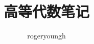 \documentclass{probook}
\title{高等代数笔记}
\author{rogeryoungh}
\begin{document}
\newcommand\mfrac[2]{\dfrac{#1\smash[b]{\strut}}{#2\smash[t]{\strut}}}
\newcommand\RR{\mathbb{R}}
\newcommand\NN{\mathbb{N}}
\newcommand\ZZ{\mathbb{Z}}
\newcommand\QQ{\mathbb{Q}}
\newcommand\CC{\mathbb{C}}
\newcommand\ee{\mathrm{e}}
\newcommand\dd{\mathrm{d}}
\newcommand\uppi{\mathrm{\pi}}
\newcommand\transpose[1]{{#1}^\mathsf{T}}

\newcommand\rank{\operatorname{rank}}
\newcommand\diag{\operatorname{diag}}
\renewcommand\Im{\operatorname{Im}}
\newcommand\tr{\operatorname{tr}}
\renewcommand\char{\operatorname{char}}
\newcommand\codim{\operatorname{codim}}

\newcommand\aaa{\alpha}
\newcommand\AAA{\boldsymbol{A}}
\newcommand\bbb{\beta}
\newcommand\eee{\eta}
\renewcommand\ggg{\gamma}
\newcommand\XXX{X}
\newcommand\YYY{Y}
\newcommand\ling{\boldsymbol{0}}

\newcommand\num[1]{{\fzfs{（}}{\rm{#1}}{\fzfs{）}}}

\maketitle

\frontmatter

\tableofcontents

\mainmatter

\end{document}
